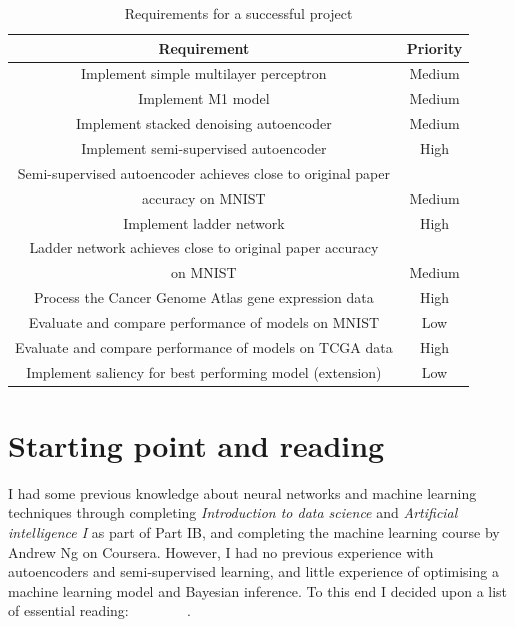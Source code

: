 \begin{table}[H]
  \label{tab:requirements}
  \small %
  \centering %
  \begin{tabular}{cc} %
  \toprule[\heavyrulewidth]\toprule[\heavyrulewidth]
  \textbf{Requirement} & \textbf{Priority} \\ 
  \midrule
  Implement simple multilayer perceptron & Medium \\
  Implement M1 model & Medium \\
  Implement stacked denoising autoencoder & Medium \\
  Implement semi-supervised autoencoder & High \\
  Semi-supervised autoencoder achieves close to original paper \\ accuracy on MNIST & Medium \\
  Implement ladder network & High \\
  Ladder network achieves close to original paper accuracy \\ on MNIST & Medium \\
  Process the Cancer Genome Atlas gene expression data & High \\
  Evaluate and compare performance of models on MNIST & Low \\
  Evaluate and compare performance of models on TCGA data & High \\
  Implement saliency for best performing model (extension) & Low \\
  \bottomrule[\heavyrulewidth] 
  \end{tabular}
  \caption{Requirements for a successful project} 
\end{table}

\section{Starting point and reading} \label{reading}

I had some previous knowledge about neural networks and machine learning techniques through completing \textit{Introduction to data science}
and \textit{Artificial intelligence I} as part of Part IB, and completing the machine learning course by Andrew Ng on Coursera. However,
I had no previous experience with autoencoders and semi-supervised learning, and little experience of optimising 
a machine learning model and Bayesian inference. To this end I decided upon a list of essential reading:~\cite{ML_Bayes}~\cite{Goodfellow-et-al-2016}
~\cite{DBLP:journals/corr/KingmaW13}~\cite{DBLP:journals/corr/KingmaRMW14}~\cite{Vincent:2010:SDA:1756006.1953039}
~\cite{DBLP:journals/corr/Valpola14}~\cite{DBLP:journals/corr/RasmusVHBR15}.

